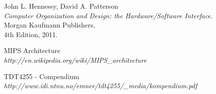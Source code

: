 
\begin{thebibliography}{9}

  John L. Hennessy, David A. Patterson\\
  \emph{Computer Organization and Design: the Hardware/Software Interface}.\\
  Morgan Kaufmann Publishers,\\
  4th Edition, 2011.

 MIPS Architecture\\
	\emph{http://en.wikipedia.org/wiki/MIPS\_architecture}

 TDT4255 - Compendium\\
	\emph{http://www.idi.ntnu.no/emner/tdt4255/\_media/kompendium.pdf}

\end{thebibliography}